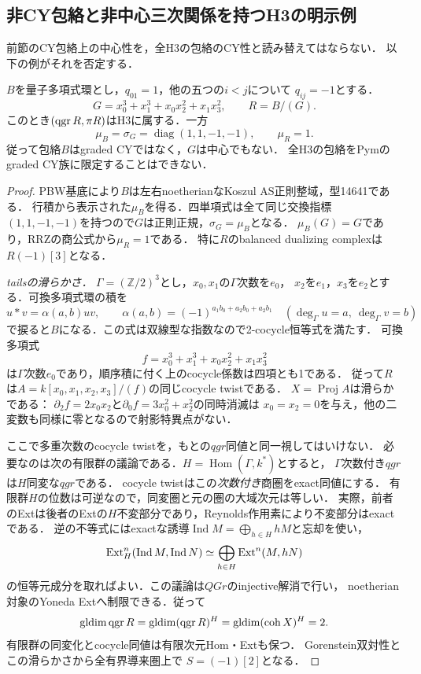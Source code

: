 \subsection{非CY包絡と非中心三次関係を持つH3の明示例}
\label{sec:noncy-sign-cubic}
前節のCY包絡上の中心性を，全H3の包絡のCY性と読み替えてはならない．
以下の例がそれを否定する．
\begin{theorem}[符号型の非中心反標準三次商]
\label{thm:noncy-sign-cubic}
$B$を量子多項式環とし，$q_{01}=1$，他の五つの$i<j$について
$q_{ij}=-1$とする．
\[
 G=x_0^3+x_1^3+x_0x_2^2+x_1x_3^2,\qquad R=B/(G).
\]
このとき$(\operatorname{qgr} R,\pi R)$はH3に属する．一方
\[
 \mu_B=\sigma_G=\operatorname{diag}(1,1,-1,-1),\qquad \mu_R=1.
\]
従って包絡$B$はgraded CYではなく，$G$は中心でもない．
全H3の包絡をPymのgraded CY族に限定することはできない．
\end{theorem}
\begin{proof}
PBW基底により$B$は左右noetherianなKoszul AS正則整域，型14641である．
行積から表示された$\mu_B$を得る．四単項式は全て同じ交換指標
$(1,1,-1,-1)$を持つので$G$は正則正規，$\sigma_G=\mu_B$となる．
$\mu_B(G)=G$であり，RRZの商公式から$\mu_R=1$である．
特に$R$のbalanced dualizing complexは$R(-1)[3]$となる．

\emph{tailsの滑らかさ．}
$\Gamma=(\mathbb Z/2)^3$とし，$x_0,x_1$の$\Gamma$次数を$e_0$，
$x_2$を$e_1$，$x_3$を$e_2$とする．可換多項式環の積を
\[
 u*v=\alpha(a,b)uv,\qquad
 \alpha(a,b)=(-1)^{a_1b_0+a_2b_0+a_2b_1}
 \quad(\deg_\Gamma u=a,\ \deg_\Gamma v=b)
\]
で捩ると$B$になる．この式は双線型な指数なので2-cocycle恒等式を満たす．
可換多項式
\[
 f=x_0^3+x_1^3+x_0x_2^2+x_1x_3^2
\]
は$\Gamma$次数$e_0$であり，順序積に付く上のcocycle係数は四項とも1である．
従って$R$は$A=k[x_0,x_1,x_2,x_3]/(f)$の同じcocycle twistである．
$X=\operatorname{Proj}A$は滑らかである：
$\partial_2f=2x_0x_2$と$\partial_0f=3x_0^2+x_2^2$の同時消滅は
$x_0=x_2=0$を与え，他の二変数も同様に零となるので射影特異点がない．

ここで多重次数のcocycle twistを，もとの$qgr$同値と同一視してはいけない．
必要なのは次の有限群の議論である．$H=\operatorname{Hom}(\Gamma,k^*)$とすると，
$\Gamma$次数付き$qgr$は$H$同変な$qgr$である．
cocycle twistはこの\emph{次数付き}商圏をexact同値にする．
有限群$H$の位数は可逆なので，同変圏と元の圏の大域次元は等しい．
実際，前者のExtは後者のExtの$H$不変部分であり，Reynolds作用素により不変部分はexactである．
逆の不等式にはexactな誘導$\operatorname{Ind}M=\bigoplus_{h\in H}hM$と忘却を使い，
\[
 \operatorname{Ext}^n_H(\operatorname{Ind}M,\operatorname{Ind}N)
 \simeq\bigoplus_{h\in H}\operatorname{Ext}^n(M,hN)
\]
の恒等元成分を取ればよい．この議論は$QGr$のinjective解消で行い，
noetherian対象のYoneda Extへ制限できる．従って
\[
 \operatorname{gldim}\operatorname{qgr} R=\operatorname{gldim}(\operatorname{qgr} R)^H
 =\operatorname{gldim}(\operatorname{coh}X)^H=2.
\]
有限群の同変化とcocycle同値は有限次元Hom・Extも保つ．
Gorenstein双対性とこの滑らかさから全有界導来圏上で
$S=(-1)[2]$となる．


\end{proof}

